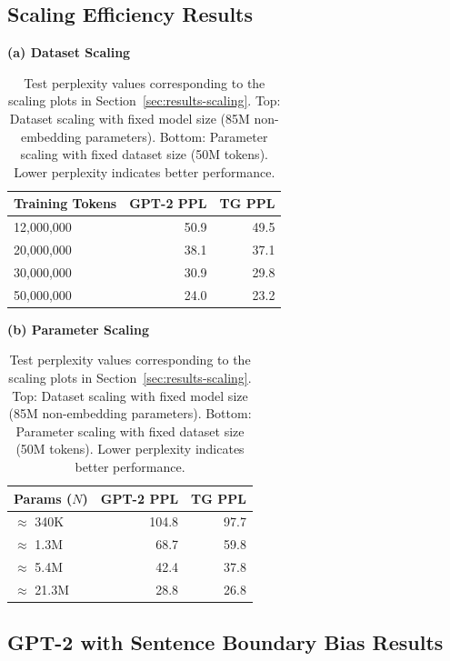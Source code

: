 \documentclass{article}
\begin{document}
\subsection{Scaling Efficiency Results}
\label{app:scaling_tables}
\begin{table}[H]
    \centering
    \caption{Test perplexity values corresponding to the scaling plots in Section~\ref{sec:results-scaling}. Top: Dataset scaling with fixed model size (85M non-embedding parameters). Bottom: Parameter scaling with fixed dataset size (50M tokens). Lower perplexity indicates better performance.}
    \label{tab:scaling_results}
    
    \vspace{0.5em}
    \textbf{(a) Dataset Scaling}
    \vspace{0.2em}
    
    \begin{tabular}{lrr}
        \toprule
        \textbf{Training Tokens} & \textbf{GPT-2 PPL} & \textbf{TG PPL} \\
        \midrule
        12,000,000 & 50.9 & 49.5 \\
        20,000,000 & 38.1 & 37.1 \\
        30,000,000 & 30.9 & 29.8 \\
        50,000,000 & 24.0 & 23.2 \\
        \bottomrule
    \end{tabular}

    \vspace{1em}
    \textbf{(b) Parameter Scaling}
    \vspace{0.2em}
    
    \begin{tabular}{lrr}
        \toprule
        \textbf{Params ($N$)} & \textbf{GPT-2 PPL} & \textbf{TG PPL} \\
        \midrule
        $\approx$ 340K  & 104.8 & 97.7 \\
        $\approx$ 1.3M  & 68.7  & 59.8 \\
        $\approx$ 5.4M  & 42.4  & 37.8 \\
        $\approx$ 21.3M & 28.8  & 26.8 \\
        \bottomrule
    \end{tabular}
\end{table}


\subsection{GPT-2 with Sentence Boundary Bias Results}
\label{tab:sent_bias_table}
\end{document}
